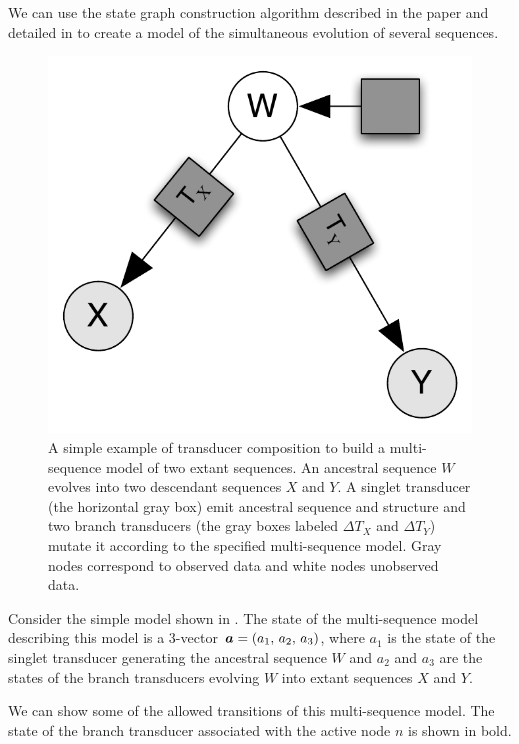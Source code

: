 \documentclass[10pt]{article}
\begin{document}
We can use the state graph construction algorithm described 
in the paper and detailed in  to create a model of the simultaneous evolution
of several sequences.

\begin{figure}[!htb]
  \centering
  \includegraphics [scale=0.4] {figs/parent.pdf}
  \caption{
    A simple example of transducer composition to build a multi-sequence model of two extant sequences.
    An ancestral sequence $W$ evolves into two descendant sequences $X$ and $Y$.
    A singlet transducer (the horizontal gray box) emit ancestral sequence and structure
    and two branch transducers (the gray boxes labeled $\Delta T_X$ and $\Delta T_Y$)
    mutate it according to the specified multi-sequence model.
    Gray nodes correspond to observed data and white nodes unobserved data.
  }
\end{figure}

Consider the simple model shown in .
The state of the multi-sequence model describing this model is a 3-vector $\boldsymbol{a} = \left( a_1,\,a_2,\,a_3 \right)$,
where $a_1$ is the state of the singlet transducer generating the ancestral sequence $W$
and $a_2$ and $a_3$ are the states of the branch transducers evolving $W$ into
extant sequences $X$ and $Y$.

We can show some of the allowed transitions of this multi-sequence model.
The state of the branch transducer associated with the active node $n$ is shown in bold.
\end{document}
